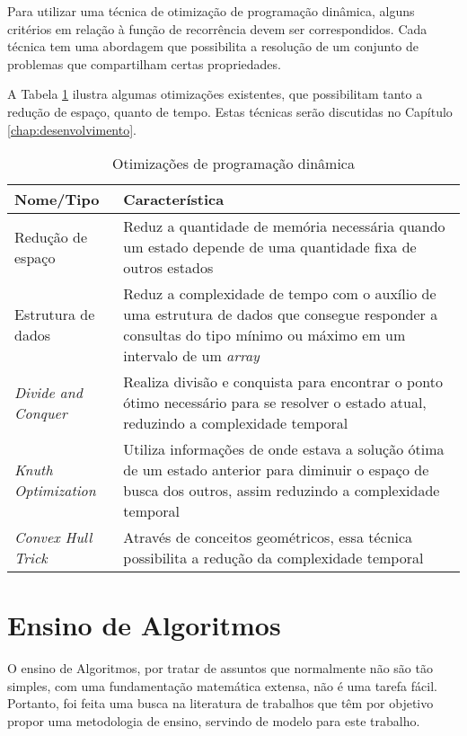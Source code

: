 Para utilizar uma técnica de otimização de programação dinâmica, alguns critérios em relação à função de recorrência devem ser correspondidos. Cada técnica tem uma abordagem que possibilita a resolução de um conjunto de problemas que compartilham certas propriedades.

A Tabela \ref{tab:otimizacoes} ilustra algumas otimizações existentes, que possibilitam tanto a redução de espaço, quanto de tempo. Estas técnicas serão discutidas no Capítulo \ref{chap:desenvolvimento}.

\begin{table}[H]
	\centering
	\caption[Otimizações de programação dinâmica]{Otimizações de programação dinâmica}
	\label{tab:otimizacoes}
	\begin{tabular}{p{4cm}  p{11cm}}
		\hline \SPACE
		\textbf{Nome/Tipo} & \textbf{Característica} \\ \hline \SPACE
		Redução de espaço &  Reduz a quantidade de memória necessária quando um estado depende de uma quantidade fixa de outros estados \\ \hline \SPACE
		Estrutura de dados &  Reduz a complexidade de tempo com o auxílio de uma estrutura de dados que consegue responder a consultas do tipo mínimo ou máximo em um intervalo de um \textit{array}  \\ \hline \SPACE
		\textit{Divide and Conquer} & Realiza divisão e conquista para encontrar o ponto ótimo necessário para se resolver o estado atual, reduzindo a complexidade temporal \\ \hline \SPACE
		\textit{Knuth Optimization} & Utiliza informações de onde estava a solução ótima de um estado anterior para diminuir o espaço de busca dos outros, assim reduzindo a complexidade temporal  \\ \hline \SPACE
		\textit{Convex Hull Trick} & Através de conceitos geométricos, essa técnica possibilita a redução da complexidade temporal \\ \hline 
	\end{tabular}
	
\end{table}

\section{Ensino de Algoritmos}
\label{sec:ensino}

O ensino de Algoritmos, por tratar de assuntos que normalmente não são tão simples, com uma fundamentação matemática extensa, não é uma tarefa fácil. Portanto, foi feita uma busca na literatura de trabalhos que têm por objetivo propor uma metodologia de ensino, servindo de modelo para este trabalho.


